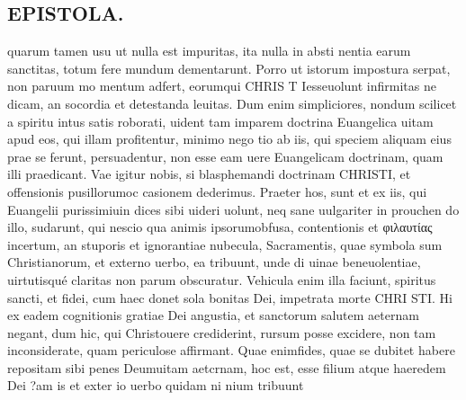 \documentclass{article}
\begin{document}
\begin{pages}
\section*{EPISTOLA. }\pstart quarum tamen usu ut nulla est impuritas, ita nulla in absti nentia earum sanctitas, totum fere mundum dementarunt. Porro ut istorum impostura serpat, non paruum mo mentum adfert, eorumqui CHRIS T Iesseuolunt infirmitas ne dicam, an socordia et detestanda leuitas. Dum enim simpliciores, nondum scilicet a spiritu intus satis roborati, uident tam imparem doctrina Euangelica uitam apud eos, qui illam profitentur, minimo nego tio ab iis, qui speciem aliquam eius prae se ferunt, persuadentur, non esse eam uere Euangelicam doctrinam, quam illi praedicant.  Vae igitur nobis, si blasphemandi doctrinam CHRISTI, et offensionis pusillorumoc casionem dederimus.  \pend\pstart Praeter hos, sunt et ex iis, qui Euangelii purissimiuin dices sibi uideri uolunt, neq sane uulgariter in prouchen do illo, sudarunt, qui nescio qua animis ipsorumobfusa, contentionis et φιλαυτίας incertum, an stuporis et ignorantiae nubecula, Sacramentis, quae symbola sum Christianorum, et externo uerbo, ea tribuunt, unde di uinae beneuolentiae, uirtutisqué claritas non parum obscuratur. Vehicula enim illa faciunt, spiritus sancti, et fidei, cum haec donet sola bonitas Dei, impetrata morte CHRI STI. Hi ex eadem cognitionis gratiae Dei angustia, et sanctorum salutem aeternam negant, dum hic, qui Christouere crediderint, rursum posse excidere, non tam inconsiderate, quam periculose affirmant. Quae enimfides, quae se dubitet habere repositam sibi penes Deumuitam aetcrnam, hoc est, esse filium atque haeredem Dei ?am  \pendSacramen is et exter io uerbo quidam ni nium tribuunt

\end{pages}
\end{document}
